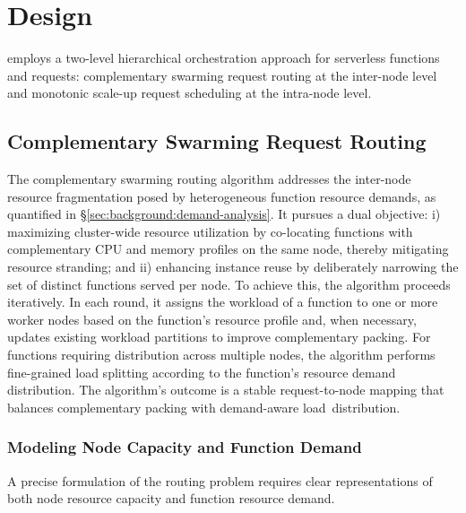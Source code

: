 \section{\sysname Design}

\sysname employs a two-level hierarchical orchestration approach for 
serverless functions and requests: complementary swarming request routing at the
inter-node level and monotonic scale-up request scheduling at the intra-node level.

\subsection{Complementary Swarming Request Routing}
\label{sec:design:placement}

The complementary swarming routing algorithm addresses the inter-node resource fragmentation 
posed by heterogeneous function resource demands, as quantified in 
\S\ref{sec:background:demand-analysis}. It pursues a dual objective: i) maximizing 
cluster-wide resource utilization by co-locating functions with complementary CPU 
and memory profiles on the same node, thereby mitigating resource stranding; 
and ii) enhancing instance reuse by deliberately narrowing the set of distinct 
functions served per node. To achieve this, the algorithm proceeds iteratively. 
In each round, it assigns the workload of a function to one or more worker nodes 
based on the function's resource profile and, when necessary, updates existing
workload partitions to improve complementary packing.
For functions requiring distribution across multiple nodes, the algorithm performs 
fine-grained load splitting according to the function's resource demand distribution.
The algorithm's outcome is a stable request-to-node mapping that balances complementary
packing with demand-aware load~distribution.

\subsubsection{Modeling Node Capacity and Function Demand}
\label{subsec:modeling}

A precise formulation of the routing problem requires clear representations of 
both node resource capacity and function resource demand.

